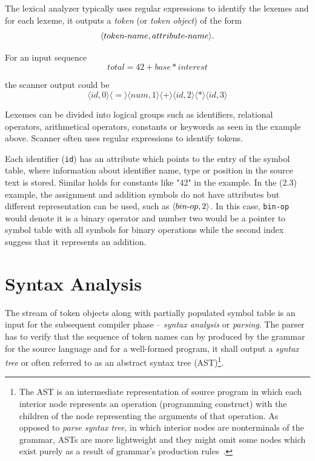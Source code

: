 \documentclass[
  digital, %
  table,   %
  lof,     %
  lot,     %
  oneside,
]{fithesis3}
\begin{document}
The lexical analyzer typically uses regular expressions to identify the lexemes and for each lexeme, it outputs a \textit{token} (or \textit{token object}) of the form 
\begin{equation}
  \langle token \textnormal{-} name, attribute \textnormal{-} name \rangle \textnormal{.}
\end{equation}

\noindent
For an input sequence 
\begin{equation}
  total = 42 + base * interest
\end{equation}
 
the scanner output could be
\begin{equation}
  \langle id, 0 \rangle 
  \langle = \rangle 
  \langle num, 1 \rangle 
  \langle + \rangle 
  \langle id, 2 \rangle 
  \langle * \rangle 
  \langle id, 3 \rangle
\end{equation}

Lexemes can be divided into logical groups such as identifiers, relational operators, arithmetical operators, constants or keywords as seen in the example above. Scanner often uses regular expressions to identify tokens.

Each identifier (\texttt{id}) has an attribute which points to the entry of the symbol table, where information about identifier name, type or position in the source text is stored. Similar holds for constants like "42" in the example. In the (2.3) example, the assignment and addition symbols do not have attributes but different representation can be used, such as $ \langle bin \textnormal{-} op, 2 \rangle $. In this case, \texttt{bin-op} would denote it is a binary operator and number two would be a pointer to symbol table with all symbols for binary operations while the second index suggess that it represents an addition.

  \section{Syntax Analysis}
The stream of token objects along with partially populated symbol table is an input for the subsequent compiler phase -- \textit{syntax analysis} or \textit{parsing}. The parser has to verify that the sequence of token names can by produced by the grammar for the source language and for a well-formed program, it shall output a \textit{syntax tree} or often referred to as an abstract syntax tree (AST)\footnote{The AST is an intermediate representation of source program in which each interior node represents an operation (programming construct) with the children of the node representing the arguments of that operation. As opposed to \textit{parse syntax tree}, in which interior nodes are nonterminals of the grammar, ASTs are more lightweight and they might omit some nodes which exist purely as a result of grammar's production rules~\cite{secure-programming-with-sca}.}.
\end{document}
